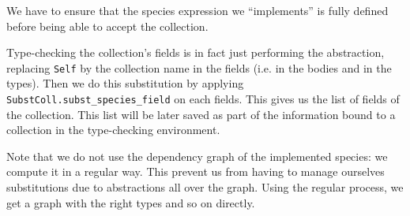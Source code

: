 \medskip
We have to ensure that the species expression we ``implements'' is
fully defined before being able to accept the collection.

\medskip
Type-checking the collection's fields is in fact just performing the
abstraction, replacing {\tt Self} by the collection name in the fields
(i.e. in the bodies and in the types). Then we do this substitution by
applying {\tt SubstColl.subst\_species\_field} on each fields. This
gives us the list of fields of the collection. This list will be later
saved as part of the information bound to a collection in the
type-checking environment.

\medskip
Note that we do not use the dependency graph of the implemented
species: we compute it in a regular way. This prevent us from having
to manage ourselves substitutions due to abstractions all over the
graph. Using the regular process, we get a graph with the right types
and so on directly.